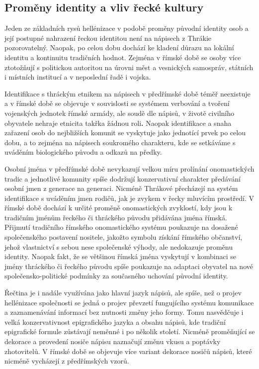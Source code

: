 
\subsection[proměny-identity-a-vliv-řecké-kultury]{Proměny identity a vliv řecké kultury}

Jeden ze základních rysů hellénizace v podobě proměny původní identity osob a její postupné nahrazení řeckou identitou není na nápisech z Thrákie pozorovatelný. Naopak, po celou dobu dochází ke kladení důrazu na lokální identitu a kontinuitu tradičních hodnot. Zejména v římské době se osoby více ztotožňují s politickou autoritou na úrovni měst a vesnických samospráv, státních i místních institucí a v neposlední řadě i vojska.

Identifikace s thráckým etnikem na nápisech v předřímské době téměř neexistuje a v římské době se objevuje v souvislosti se systémem verbování a tvoření vojenských jednotek římské armády, ale soudě dle nápisů, v životě civilního obyvatele nehraje etnicita takřka žádnou roli{\bf .} Naopak identifikace a snaha zařazení osob do nejbližších komunit se vyskytuje jako jednotící prvek po celou dobu, a to zejména na nápisech soukromého charakteru, kde se setkáváme s uváděním biologického původu a odkazů na předky.

Osobní jména v předřímské době nevykazují velkou míru prolínání onomastických tradic a jednotlivé komunity spíše dodržují konzervativní charakter předávání osobní jmen z generace na generaci. Nicméně Thrákové přecházejí na systém identifikace s uváděním jmen rodičů, jak je zvykem v řecky mluvícím prostředí. V římské době dochází k určité proměně onomastických zvyklostí, kdy jsou k tradičním jménům řeckého či thráckého původu přidávána jména římská. Přijmutí tradičního římského onomastického systému poukazuje na dosažené společenského postavení nositele, jakožto symbolu získání římského občanství, jehož vlastnictví s sebou nese společenské výhody, ale nedokazuje proměnu identity. Naopak fakt, že se většinou římská jména vyskytují v kombinaci se jmény thráckého či řeckého původu spíše poukazuje na adaptaci obyvatel na nové společensko-politické podmínky za současného uchování původní identity.

Řečtina je i nadále využívána jako hlavní jazyk nápisů, ale spíše, než o projev hellénizace společnosti se jedná o projev převzetí fungujícího systému komunikace a zaznamenávání informací bez nutnosti změny jeho formy. Tomu nasvědčuje i velká konzervativnost epigrafického jazyka a obsahu nápisů, kde tradiční epigrafické formule zůstávají neměnné i po několik století. Nicméně proměňující se dekorace a provedení nosiče nápisu naznačují změnu vkusu a poptávky zhotovitelů. V římské době se objevuje více variant dekorace nosičů nápisů, které nicméně vycházejí z předřímských vzorů.


